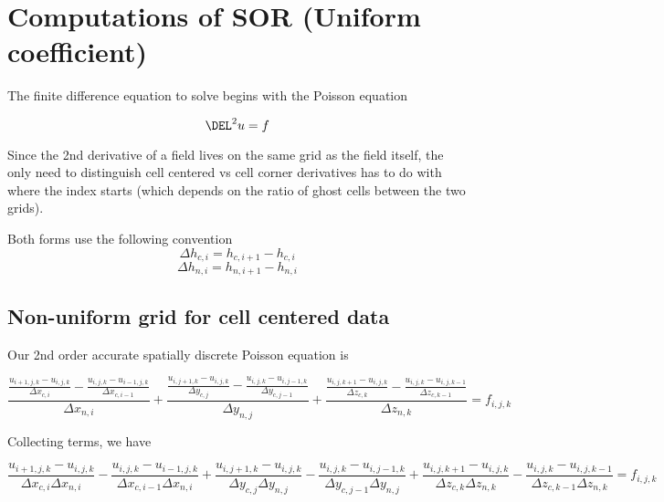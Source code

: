 \documentclass[landscape,11pt]{article}
\begin{document}
\doublespacing
\MOONSTITLE
\maketitle

\section{Computations of SOR (Uniform coefficient)}
The finite difference equation to solve begins with the Poisson equation


\begin{equation}
	\DEL^2 u = f
\end{equation}

Since the 2nd derivative of a field lives on the same grid as the field itself, the only need to distinguish cell centered vs cell corner derivatives has to do with where the index starts (which depends on the ratio of ghost cells between the two grids).

Both forms use the following convention
\begin{equation}
	\Delta h_{c,i} = h_{c,i+1} - h_{c,i}
\end{equation}
\begin{equation}
	\Delta h_{n,i} = h_{n,i+1} - h_{n,i}
\end{equation}

\subsection{Non-uniform grid for cell centered data}
Our 2nd order accurate spatially discrete Poisson equation is

\begin{equation}
	\frac{\frac{u_{i+1,j,k}-u_{i,j,k}}{\Delta x_{c,i}} - \frac{u_{i,j,k}-u_{i-1,j,k}}{\Delta x_{c,i-1}}}{\Delta x_{n,i}} +
	\frac{\frac{u_{i,j+1,k}-u_{i,j,k}}{\Delta y_{c,j}} - \frac{u_{i,j,k}-u_{i,j-1,k}}{\Delta y_{c,j-1}}}{\Delta y_{n,j}} +
	\frac{\frac{u_{i,j,k+1}-u_{i,j,k}}{\Delta z_{c,k}} - \frac{u_{i,j,k}-u_{i,j,k-1}}{\Delta z_{c,k-1}}}{\Delta z_{n,k}} = f_{i,j,k}
\end{equation}

Collecting terms, we have

\begin{equation}
	\frac{u_{i+1,j,k}-u_{i,j,k}}{\Delta x_{c,i} \Delta x_{n,i}} - \frac{u_{i,j,k}-u_{i-1,j,k}}{\Delta x_{c,i-1} \Delta x_{n,i}} +
	\frac{u_{i,j+1,k}-u_{i,j,k}}{\Delta y_{c,j} \Delta y_{n,j}} - \frac{u_{i,j,k}-u_{i,j-1,k}}{\Delta y_{c,j-1} \Delta y_{n,j}} +
	\frac{u_{i,j,k+1}-u_{i,j,k}}{\Delta z_{c,k} \Delta z_{n,k}} - \frac{u_{i,j,k}-u_{i,j,k-1}}{\Delta z_{c,k-1} \Delta z_{n,k}} = f_{i,j,k}
\end{equation}
\end{document}
